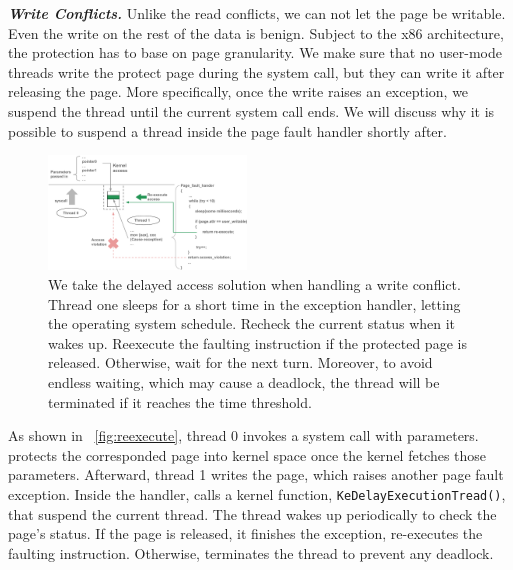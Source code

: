 
\textbf{\textit{Write Conflicts.}} Unlike the read conflicts, we can not let the page be writable. Even the write on the rest of the data is benign. Subject to the x86 architecture, the protection has to base on page granularity. We make sure that no user-mode threads write the protect page during the system call, but they can write it after releasing the page. More specifically, once the write raises an exception, we suspend the thread until the current system call ends. We will discuss why it is possible to suspend a thread inside the page fault handler shortly after.


\begin{figure}[th]
  \includegraphics[width=0.47\textwidth]{figures/reexecute}
  \centering
  \caption{We take the delayed access solution when handling a write conflict. Thread one sleeps for a short time in the exception handler, letting the operating system schedule. Recheck the current status when it wakes up. Reexecute the faulting instruction if the protected page is released. Otherwise, wait for the next turn. Moreover, to avoid endless waiting, which may cause a deadlock, the thread will be terminated if it reaches the time threshold.}
  \label{fig:reexecute}
\end{figure}


As shown in ~\autoref{fig:reexecute}, thread 0 invokes a system call with parameters.  \name protects the corresponded page into kernel space once the kernel fetches those parameters. Afterward, thread 1 writes the page, which raises another page fault exception. Inside the handler, \name calls a kernel function, \texttt{KeDelayExecutionTread()}, that suspend the current thread. The thread wakes up periodically to check the page's status. If the page is released, it finishes the exception, re-executes the faulting instruction. Otherwise, \name terminates the thread to prevent any deadlock.

